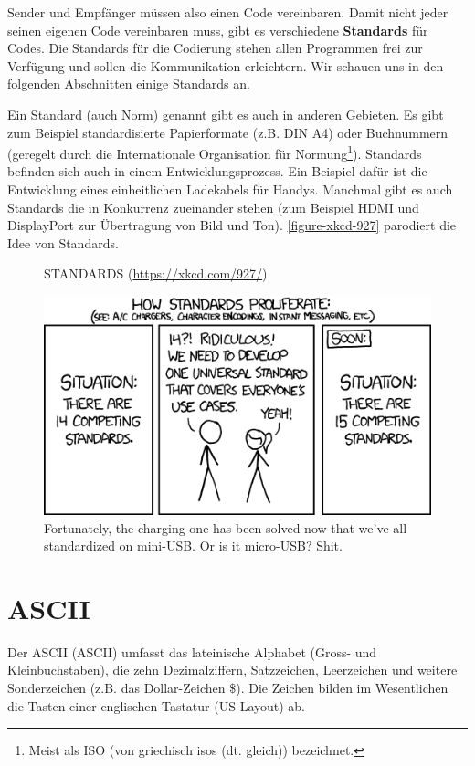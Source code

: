 Sender und Empfänger müssen also einen Code vereinbaren. Damit nicht jeder seinen eigenen Code vereinbaren muss, gibt es verschiedene \textbf{Standards} für Codes. Die Standards für die Codierung stehen allen Programmen frei zur Verfügung und sollen die Kommunikation erleichtern. Wir schauen uns in den folgenden Abschnitten einige Standards an.

\begin{hinweis}
Ein Standard (auch Norm) genannt gibt es auch in anderen Gebieten. Es gibt zum Beispiel standardisierte Papierformate (z.B. \ac{DIN} A4) oder Buchnummern (geregelt durch die Internationale Organisation für Normung\footnote{Meist als ISO (von griechisch isos (dt. gleich)) bezeichnet.}). Standards befinden sich auch in einem Entwicklungsprozess. Ein Beispiel dafür ist die Entwicklung eines einheitlichen Ladekabels für Handys. Manchmal gibt es auch Standards die in Konkurrenz zueinander stehen (zum Beispiel \ac{HDMI} und DisplayPort zur Übertragung von Bild und Ton). \autoref{figure-xkcd-927} parodiert die Idee von Standards.
\end{hinweis}

\begin{figure}[htb]
\centering
\caption*{\uppercase{Standards} (\url{https://xkcd.com/927/})}
\includegraphics[scale=0.4]{standards}
\caption{Fortunately, the charging one has been solved now that we've all standardized on mini-USB. Or is it micro-USB? Shit.}
\label{figure-xkcd-927}
\end{figure}

\section{\acs{ASCII}}

Der \acl{ASCII} (\acs{ASCII}) umfasst das lateinische Alphabet (Gross- und Kleinbuchstaben), die zehn Dezimalziffern, Satzzeichen, Leerzeichen und weitere Sonderzeichen (z.B. das Dollar-Zeichen $\$$). Die Zeichen bilden im Wesentlichen die Tasten einer englischen Tastatur (US-Layout) ab. 

